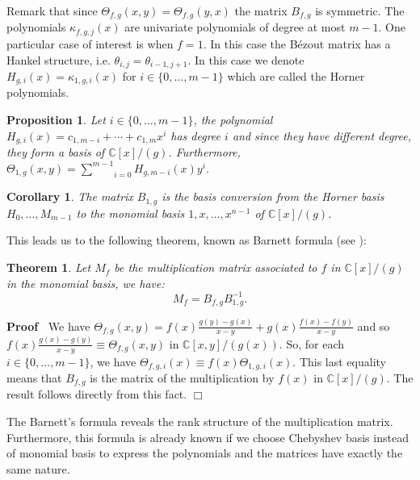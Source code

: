 \documentclass{article}
\newenvironment{proof}{\noindent\textbf{Proof\ }}{\hspace*{\fill}$\Box$\medskip}
\newtheorem{corollary}{Corollary}
\newtheorem{proposition}{Proposition}
\newtheorem{theorem}{Theorem}
\begin{document}
Remark that since $\Theta_{f, g} (x, y) = \Theta_{f, g} (y, x)$ the matrix
$B_{f, g}$ is symmetric. The polynomials $\kappa_{f, g, j} (x)$ are univariate
polynomials of degree at most $m - 1$. One particular case of interest is when
$f = 1$. In this case the B\'ezout matrix has a Hankel structure, i.e.
$\theta_{i, j} = \theta_{i - 1, j + 1}$. In this case we denote $H_{g, i} (x)
= \kappa_{1, g, i} (x)$ for $i \in \{0, \ldots, m - 1\}$ which are called the
Horner polynomials.

\begin{proposition}
  Let $i \in \{0, \ldots, m - 1\}$, the polynomial $H_{g, i} (x) = c_{1, m -
  i} + \cdots + c_{1, m} x^i$ has degree $i$ and since they have different
  degree, they form a basis of $\mathbb{C}[x] / (g)$. Furthermore,
  $\Theta_{1, g} (x, y) = \underset{i = 0}{\overset{m - 1}{\sum}} H_{g, m - i}
  (x) y^i$.
\end{proposition}

\begin{corollary}
  The matrix $B_{1, g}$ is the basis conversion from the Horner basis $H_0,
  \ldots, M_{m - 1}$ to the monomial basis $1, x, \ldots, x^{n - 1}$ of
  $\mathbb{C}[x] / (g)$.
\end{corollary}

This leads us to the following theorem, known as Barnett formula (see
{\cite{B}}):

\begin{theorem}
  Let $M_f$ be the multiplication matrix associated to $f$ in $\mathbb{C}[x]
  / (g)$ in the monomial basis, we have:
  \[ M_f = B_{f, g} B_{1, g}^{- 1} . \]
\end{theorem}

\begin{proof}
  We have $\Theta_{f, g} (x, y) = f (x) \frac{g (y) - g (x)}{x - y} + g (x)
  \frac{f (x) - f (y)}{x - y}$ and so $f (x) \frac{g (x) - g (y)}{x - y}
  \equiv \Theta_{f, g} (x, y)$ in $\mathbb{C}[x, y] / (g (x))$. So, for each
  $i \in \{0, \ldots, m - 1\}$, we have $\Theta_{f, g, i} (x) \equiv f (x)
  \Theta_{1, g, i} (x)$. This last equality means that $B_{f, g}$ is the
  matrix of the multiplication by $f (x)$ in $\mathbb{C}[x] / (g)$. The
  result follows directly from this fact.
\end{proof}

The Barnett's formula reveals the rank structure of the multiplication matrix.
Furthermore, this formula is already known if we choose Chebyshev basis
instead of monomial basis to express the polynomials and the matrices have
exactly the same nature. \
\end{document}
